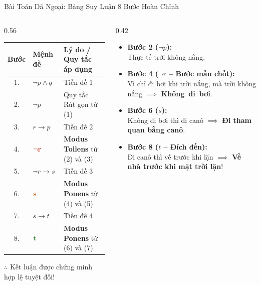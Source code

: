 \documentclass[aspectratio=169, 10pt]{beamer}
\begin{document}
\begin{frame}{Bài Toán Dã Ngoại: Bảng Suy Luận 8 Bước Hoàn Chỉnh}
  \begin{columns}[t, onlytextwidth]
    \begin{column}{0.56\textwidth}
      \begin{cozyExample}
        \centering
        \renewcommand{\arraystretch}{1.03}
        \footnotesize
        \setlength{\tabcolsep}{2.5pt}
        \begin{tabular}{cll}
          \toprule
          \textbf{Bước} & \textbf{Mệnh đề} & \textbf{Lý do / Quy tắc áp dụng} \\
          \midrule
          1. & $\neg p \land q$ & Tiền đề 1 \\
          2. & $\neg p$ & Quy tắc Rút gọn từ (1) \\
          3. & $r \to p$ & Tiền đề 2 \\
          4. & $\mathbf{\textcolor{cozyFalse}{\neg r}}$ & \textbf{Modus Tollens} từ (2) và (3) \\
          5. & $\neg r \to s$ & Tiền đề 3 \\
          6. & $\mathbf{\textcolor{cozyWarm}{s}}$ & \textbf{Modus Ponens} từ (4) và (5) \\
          7. & $s \to t$ & Tiền đề 4 \\
          8. & $\mathbf{\textcolor{cozyTrue}{t}}$ & \textbf{Modus Ponens} từ (6) và (7) \\
          \bottomrule
        \end{tabular}
        \par\vspace{0.05cm}
        \centering\footnotesize\color{cozyTrue}$\therefore$ Kết luận được chứng minh hợp lệ tuyệt đối!
      \end{cozyExample}
    \end{column}
    \begin{column}{0.42\textwidth}
      \begin{cozyInsight}
        \small
        \begin{itemize}
          \setlength{\itemsep}{2pt}
          \item \textbf{Bước 2 ($\neg p$):}\\
          Thực tế trời không nắng.
          \item \textbf{Bước 4 ($\neg r$ -- Bước mấu chốt):}\\
          Vì chỉ đi bơi khi trời nắng, mà trời không nắng $\implies$ \textbf{Không~đi~bơi}.
          \item \textbf{Bước 6 ($s$):}\\
          Không đi bơi thì đi canô $\implies$ \textbf{Đi tham quan bằng canô}.
          \item \textbf{Bước 8 ($t$ -- Đích đến):}\\
          Đi canô thì về trước khi lặn $\implies$ \textbf{Về nhà trước khi mặt trời lặn}!
        \end{itemize}
      \end{cozyInsight}
    \end{column}
  \end{columns}
\end{frame}
\end{document}
